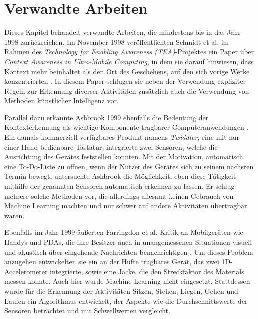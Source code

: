 \chapter{Verwandte Arbeiten}
\label{chap:relatedwork}

Dieses Kapitel behandelt verwandte Arbeiten, die mindestens bis in das Jahr 1998 zurückreichen. Im November 1998 veröffentlichten Schmidt et al. im Rahmen des \textit{Technology for Enabling Awareness (TEA)}-Projektes ein Paper über \textit{Context Awareness in Ultra-Mobile Computing}, in dem sie darauf hinwiesen, dass Kontext mehr beinhaltet als den Ort des Geschehens, auf den sich vorige Werke konzentrierten \cite{Schmidt1999}. In diesem Paper schlugen sie neben der Verwendung expliziter Regeln zur Erkennung diverser Aktivitäten zusätzlich auch die Verwendung von Methoden künstlicher Intelligenz vor.

Parallel dazu erkannte Ashbrook 1999 ebenfalls die Bedeutung der Kontexterkennung als wichtige Komponente tragbarer Computeranwendungen \cite{Ashbrook1999}. Ein damals kommerziell verfügbares Produkt namens \textit{Twiddler}, eine mit nur einer Hand bedienbare Tastatur, integrierte zwei Sensoren, welche die Ausrichtung des Gerätes feststellen konnten. Mit der Motivation, automatisch eine To-Do-Liste zu öffnen, wenn der Nutzer des Gerätes sich zu seinem nächsten Termin bewegt, untersuchte Ashbrook die Möglichkeit, eben diese Tätigkeit mithilfe der genannten Sensoren automatisch erkennen zu lassen. Er schlug mehrere solche Methoden vor, die allerdings allesamt keinen Gebrauch von Machine Learning machten und nur schwer auf andere Aktivitäten übertragbar waren.

Ebenfalls im Jahr 1999 äußerten Farringdon et al. Kritik an Mobilgeräten wie Handys und PDAs, die ihre Besitzer auch in unangemessenen Situationen visuell und akustisch über eingehende Nachrichten benachrichtigen \cite{Farringdon1999}. Um dieses Problem anzugehen entwickelten sie ein an der Hüfte tragbares Gerät, das zwei 1D-Accelerometer integrierte, sowie eine Jacke, die den Streckfaktor des Materials messen konnte. Auch hier wurde Machine Learning nicht eingesetzt. Stattdessen wurde für die Erkennung der Aktivitäten Sitzen, Stehen, Liegen, Gehen und Laufen ein Algorithmus entwickelt, der Aspekte wie die Durchschnittswerte der Sensoren betrachtet und mit Schwellwerten vergleicht.

